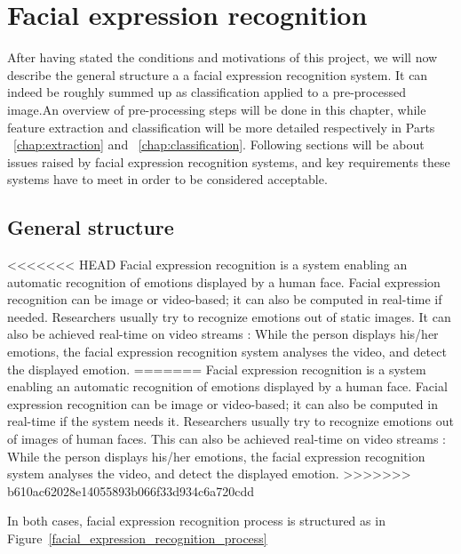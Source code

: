 \chapter{Facial expression recognition}

\noindent After having stated the conditions and motivations of this project, we will now describe the general structure a a facial expression recognition system. It can indeed be roughly summed up as classification applied to a pre-processed image.An overview of pre-processing steps will be done in this chapter, while feature extraction and classification will be more detailed respectively in Parts ~\ref{chap:extraction} and ~\ref{chap:classification}. Following sections will be about issues raised by facial expression recognition systems, and key requirements these systems have to meet in order to be considered acceptable.

\section{General structure}

\vspace{\baselineskip}
<<<<<<< HEAD
\noindent Facial expression recognition is a system enabling an automatic recognition of emotions displayed by a human face. Facial expression recognition can be image or video-based; it can also be computed in real-time if needed. Researchers usually try to recognize emotions out of static images. It can also be achieved real-time on video streams : While the person displays his/her emotions, the facial expression recognition system analyses the video, and detect the displayed emotion.
=======
\noindent Facial expression recognition is a system enabling an automatic recognition of emotions displayed by a human face. Facial expression recognition can be image or video-based; it can also be computed in real-time if the system needs it. Researchers usually try to recognize emotions out of images of human faces. This can also be achieved real-time on video streams : While the person displays his/her emotions, the facial expression recognition system analyses the video, and detect the displayed emotion.
>>>>>>> b610ac62028e14055893b066f33d934c6a720cdd
\newline

\noindent In both cases, facial expression recognition process is structured as in Figure~\ref{facial_expression_recognition_process}
\newline

